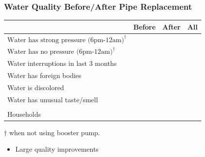 \documentclass[aspectratio=32]{beamer}
\begin{document}
\begin{frame}
\frametitle{Water Quality Before/After Pipe Replacement}
\centering


\begin{table}[h!] 
\centering
\vspace{-2mm}
\begin{threeparttable}
\begin{tabular}{@{}l*{1}{ccc}@{}}
\toprule
  & Before & After  & All \\
\midrule
$\text{Water has strong pressure (6pm-12am)}^{\dagger}$ &  \\
$\text{Water has no pressure (6pm-12am)}^{\dagger}$  &  \\
Water interruptions in last 3 months &  \\
Water has foreign bodies &  \\
Water is discolored &  \\
Water has unusual taste/smell &  \\
\\[-.5em]
Households &  \\
\bottomrule
\end{tabular}
\begin{tablenotes}
\footnotesize
\item  $\dagger$ when not using booster pump.\,\,
\end{tablenotes}
\end{threeparttable}
\end{table}
\begin{itemize}
  \item Large quality improvements
\end{itemize}

\end{frame}
\end{document}
